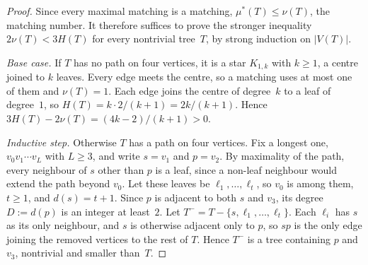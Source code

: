 \documentclass[11pt]{article}
\theoremstyle{definition}
\theoremstyle{remark}
\newcommand{\mustar}{\mu^{*}}
\begin{document}
\begin{proof}
Since every maximal matching is a matching, $\mustar(T) \le \nu(T)$, the
matching number.  It therefore suffices to prove the stronger inequality
$2\nu(T) < 3H(T)$ for every nontrivial tree~$T$, by strong
induction on $|V(T)|$.

\emph{Base case.}  If $T$ has no path on four vertices, it is a star
$K_{1,k}$ with $k \ge 1$, a centre joined to $k$ leaves.  Every edge meets
the centre, so a matching uses at most one of them and $\nu(T) = 1$.  Each
edge joins the centre of degree~$k$ to a leaf of degree~$1$, so
$H(T) = k \cdot 2/(k+1) = 2k/(k+1)$.  Hence
$3H(T) - 2\nu(T) = (4k-2)/(k+1) > 0$.

\emph{Inductive step.}  Otherwise $T$ has a path on four vertices.
Fix a longest one, $v_0 v_1 \cdots v_L$ with $L \ge 3$, and write $s = v_1$
and $p = v_2$.  By
maximality of the path, every neighbour of $s$ other than $p$ is a leaf,
since a non-leaf neighbour would extend the path beyond $v_0$.  Let
these leaves be $\ell_1, \ldots, \ell_t$, so $v_0$ is among them, $t \ge 1$, and
$d(s) = t+1$.  Since $p$ is adjacent to both $s$ and $v_3$, its degree
$D := d(p)$ is an integer at least~$2$.  Let
$T^- = T - \{s, \ell_1, \ldots, \ell_t\}$.
Each $\ell_i$ has $s$ as its only neighbour, and $s$ is otherwise adjacent
only to $p$, so $sp$ is the only edge joining the removed vertices to the
rest of $T$.  Hence $T^-$ is a tree containing $p$ and $v_3$, nontrivial and
smaller than~$T$.


\end{proof}
\end{document}
